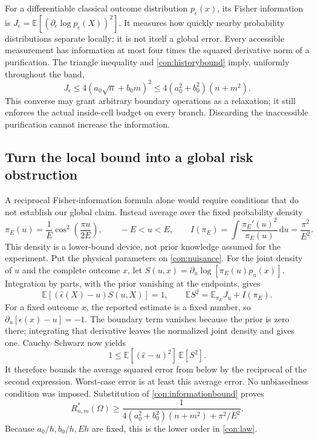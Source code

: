 \documentclass[11pt,a4paper]{article}
\numberwithin{equation}{section}
\theoremstyle{remark}
\newcommand{\dd}{\mathrm d}
\newcommand{\E}{\mathbb E}
\begin{document}
For a differentiable classical outcome distribution $p_\epsilon(x)$,
its Fisher information is
$J_\epsilon=\mathbb E[(\partial_\epsilon\log p_\epsilon(X))^2]$.
It measures how quickly nearby probability distributions separate locally;
it is not itself a global error. Every accessible measurement has
information at most four times the squared derivative norm of a
purification. The triangle inequality and \eqref{con:historybound} imply,
uniformly throughout the band,
\begin{equation}
 J_\epsilon\le4(a_0\sqrt n+b_0m)^2
 \le4(a_0^2+b_0^2)(n+m^2).
 \label{con:informationbound}
\end{equation}
This converse may grant arbitrary boundary operations as a relaxation;
it still enforces the actual inside-cell budget on every branch.
Discarding the inaccessible purification cannot increase the information.

\subsection{Turn the local bound into a global risk obstruction}

A reciprocal Fisher-information formula alone would require conditions
that do not establish our global claim. Instead average over the fixed
probability density
\begin{equation}
 \pi_E(u)=\frac1E\cos^2\!\left(\frac{\pi u}{2E}\right),
 \qquad -E<u<E,\qquad
 I(\pi_E)=\int\frac{\pi_E'(u)^2}{\pi_E(u)}\,\dd u
          =\frac{\pi^2}{E^2}.
\end{equation}
This density is a lower-bound device, not prior knowledge assumed for the
experiment. Put the physical parameters on \eqref{con:nuisance}.
For the joint density of $u$ and the complete outcome $x$, let
$S(u,x)=\partial_u\log[\pi_E(u)p_u(x)]$.
Integration by parts, with the prior vanishing at the endpoints, gives
\begin{equation}
 \mathbb E[(\widehat\epsilon(X)-u)S(u,X)]=1,\qquad
 \mathbb E S^2=\mathbb E_{\pi_E}J_u+I(\pi_E).
\end{equation}
For a fixed outcome $x$, the reported estimate is a fixed number,
so $\partial_u[\widehat\epsilon(x)-u]=-1$. The boundary term vanishes
because the prior is zero there; integrating that derivative leaves
the normalized joint density and gives one. Cauchy--Schwarz now yields
\begin{equation}
 1\le \E[(\widehat\epsilon-u)^2]\,\E[S^2].
\end{equation}
It therefore bounds the average squared error from below
by the reciprocal of the second expression. Worst-case error is at least
this average error. No unbiasedness condition was imposed. Substitution
of \eqref{con:informationbound} proves
\begin{equation}
 R_{n,m}^*(\Omega)\ge
 \frac1{4(a_0^2+b_0^2)(n+m^2)+\pi^2/E^2}.
 \label{con:lower}
\end{equation}
Because $a_0/h,b_0/h,Eh$ are fixed, this is the lower order in
\eqref{con:law}.
\end{document}
